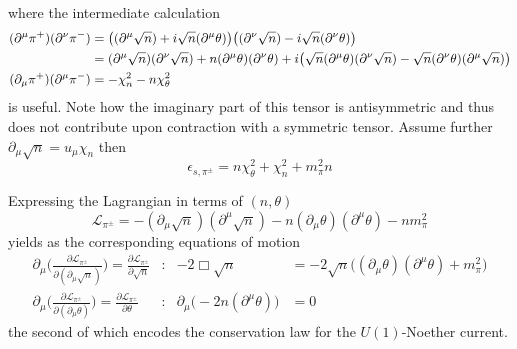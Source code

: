 where the intermediate calculation
\begin{subequations}
    \begin{align}
        (\partial^\mu\pi^+)(\partial^\nu\pi^-)&=\big((\partial^\mu\sqrt{n})+{i}\sqrt{n}(\partial^\mu\theta)\big)\big((\partial^\nu\sqrt{n})-{i}\sqrt{n}(\partial^\nu\theta)\big)\\
        &=(\partial^\mu\sqrt{n})(\partial^\nu\sqrt{n})+n(\partial^\mu\theta)(\partial^\nu\theta)+{i}\big(\sqrt{n}(\partial^\mu\theta)(\partial^\nu\sqrt{n})-\sqrt{n}(\partial^\nu\theta)(\partial^\mu\sqrt{n})\big)\\
        (\partial_\mu\pi^+)(\partial^\mu\pi^-)&=-\chi_n^2-n\chi_\theta^2
    \end{align}
\end{subequations}
is useful. Note how the imaginary part of this tensor is antisymmetric and thus does not contribute upon contraction with a symmetric tensor. Assume further $\partial_\mu\sqrt{n}=u_\mu\chi_n$ then
\begin{equation}
    \epsilon_{s,\pi^\pm}=n\chi_\theta^2+\chi_n^2+m_\pi^2n
\end{equation}

Expressing the Lagrangian in terms of $(n,\theta)$ 
\begin{equation}
    \mathscr{L}_{\pi^\pm}=-(\partial_\mu\sqrt{n})(\partial^\mu\sqrt{n})-n(\partial_\mu\theta)(\partial^\mu\theta)-nm_\pi^2
\end{equation}
yields as the corresponding equations of motion
\begin{subequations}
    \begin{align}
        \partial_\mu\Bigg(\frac{\partial\mathscr{L}_{\pi^\pm}}{\partial(\partial_\mu\sqrt{n})}\Bigg)=\frac{\partial\mathscr{L}_{\pi^\pm}}{\partial\sqrt{n}}&:&-2\Box\sqrt{n}&=-2\sqrt{n}\big((\partial_\mu\theta)(\partial^\mu\theta)+m_\pi^2\big)\\
        \partial_\mu\Bigg(\frac{\partial\mathscr{L}_{\pi^\pm}}{\partial(\partial_\mu\theta)}\Bigg)=\frac{\partial\mathscr{L}_{\pi^\pm}}{\partial\theta}&:&\partial_\mu\big(-2n(\partial^\mu\theta)\big)&=0
    \end{align}
\end{subequations}
the second of which encodes the conservation law for the $U(1)$-Noether current.
    
